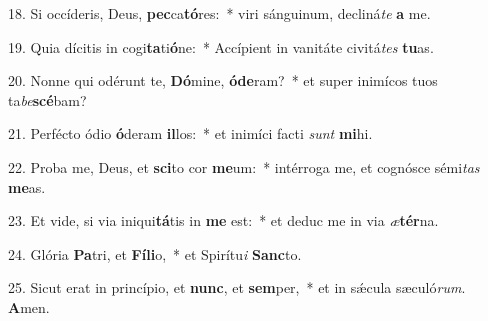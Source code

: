 18. Si occíderis, Deus, \textbf{pec}ca\textbf{tó}res:~*  viri sánguinum, decliná\textit{te} \textbf{a} me.\

19. Quia dícitis in cogi\textbf{ta}ti\textbf{ó}ne:~*  Accípient in vanitáte civitá\textit{tes} \textbf{tu}as.\

20. Nonne qui odérunt te, \textbf{Dó}mine, \textbf{ó}\textbf{de}ram?~*  et super inimícos tuos ta\textit{be}\textbf{scé}bam?\

21. Perfécto ódio \textbf{ó}deram \textbf{il}los:~*  et inimíci facti \textit{sunt} \textbf{mi}hi.\

22. Proba me, Deus, et \textbf{sci}to cor \textbf{me}um:~*  intérroga me, et cognósce sémi\textit{tas} \textbf{me}as.\

23. Et vide, si via iniqui\textbf{tá}tis in \textbf{me} est:~*  et deduc me in via \textit{æ}\textbf{tér}na.\

24. Glória \textbf{Pa}tri, et \textbf{Fí}\textbf{li}o,~*  et Spirítu\textit{i} \textbf{Sanc}to.\

25. Sicut erat in princípio, et \textbf{nunc}, et \textbf{sem}per,~*  et in sǽcula sæculó\textit{rum}. \textbf{A}men.\

